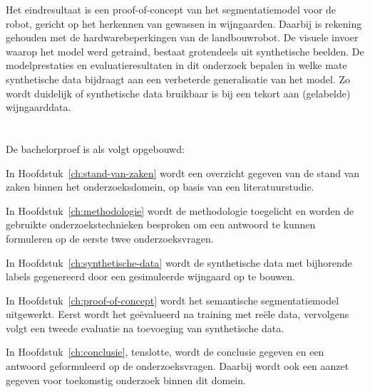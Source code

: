 Het eindresultaat is een proof-of-concept van het segmentatiemodel voor de robot, gericht op het herkennen van gewassen in wijngaarden. Daarbij is rekening gehouden met de hardwarebeperkingen van de landbouwrobot. De visuele invoer waarop het model werd getraind, bestaat grotendeels uit synthetische beelden. De modelprestaties en evaluatieresultaten in dit onderzoek bepalen in welke mate synthetische data bijdraagt aan een verbeterde generalisatie van het model. Zo wordt duidelijk of synthetische data bruikbaar is bij een tekort aan (gelabelde) wijngaarddata.

\section{}%
\label{sec:opzet-bachelorproef}


De bachelorproef is als volgt opgebouwd:

In Hoofdstuk~\ref{ch:stand-van-zaken} wordt een overzicht gegeven van de stand van zaken binnen het onderzoeksdomein, op basis van een literatuurstudie.

In Hoofdstuk~\ref{ch:methodologie} wordt de methodologie toegelicht en worden de gebruikte onderzoekstechnieken besproken om een antwoord te kunnen formuleren op de eerste twee onderzoeksvragen.


In Hoofdstuk~\ref{ch:synthetische-data} wordt de synthetische data met bijhorende labels gegenereerd door een gesimuleerde wijngaard op te bouwen.

In Hoofdstuk~\ref{ch:proof-of-concept} wordt het semantische segmentatiemodel uitgewerkt. Eerst wordt het geëvalueerd na training met reële data, vervolgens volgt een tweede evaluatie na toevoeging van synthetische data.

In Hoofdstuk~\ref{ch:conclusie}, tenslotte, wordt de conclusie gegeven en een antwoord geformuleerd op de onderzoeksvragen. Daarbij wordt ook een aanzet gegeven voor toekomstig onderzoek binnen dit domein.